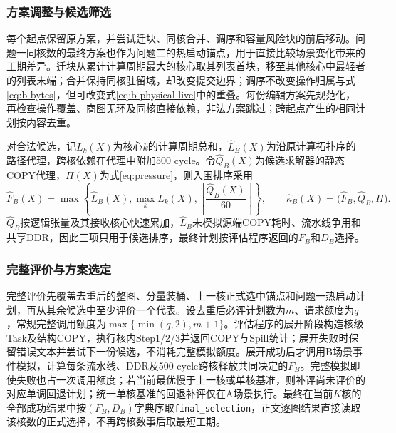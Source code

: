 \subsubsection{方案调整与候选筛选}
每个起点保留原方案，并尝试迁块、同核合并、调序和容量风险块的前后移动。问题一同核数的最终方案也作为问题二的热启动锚点，用于直接比较场景变化带来的工期差异。迁块从累计计算周期最大的核心取其列表首块，移至其他核心中最轻者的列表末端；合并保持同核驻留域，却改变提交边界；调序不改变操作归属与式\eqref{eq:b-bytes}，但可改变式\eqref{eq:b-physical-live}中的重叠。每份编辑方案先规范化，再检查操作覆盖、商图无环及同核直接依赖，非法方案跳过；跨起点产生的相同计划按内容去重。

对合法候选，记$L_k(X)$为核心$k$的计算周期总和，$\widehat L_B(X)$为沿原计算拓扑序的路径代理，跨核依赖在代理中附加500 cycle。令$\widehat Q_B(X)$为候选求解器的静态COPY代理，$\Pi(X)$为式\eqref{eq:pressure}，则入围排序采用
\begin{equation}
\widehat F_B(X)=\max\left\{\widehat L_B(X),\max_k L_k(X),
\left\lceil\frac{\widehat Q_B(X)}{60}\right\rceil\right\},\qquad
\widehat\kappa_B(X)=\bigl(\widehat F_B,\widehat Q_B,\Pi\bigr).
\label{eq:b-light-score}
\end{equation}
$\widehat Q_B$按逻辑张量及其接收核心快速累加，$\widehat L_B$未模拟源端COPY耗时、流水线争用和共享DDR，因此三项只用于候选排序，最终计划按评估程序返回的$F_B$和$D_B$选择。

\subsubsection{完整评价与方案选定}
完整评价先覆盖去重后的整图、分量装桶、上一核正式选中锚点和问题一热启动计划，再从其余候选中至少评价一个代表。设去重后必评计划数为$m$、请求额度为$q$，常规完整调用额度为$\max\{\min(q,2),m+1\}$。评估程序的展开阶段构造核级Task及结构COPY，执行核内Step1/2/3并返回COPY与Spill统计；展开失败时保留错误文本并尝试下一份候选，不消耗完整模拟额度。展开成功后才调用B场景事件模拟，计算每条流水线、DDR及500 cycle跨核释放共同决定的$F_B$。完整模拟即使失败也占一次调用额度；若当前最优慢于上一核或单核基准，则补评尚未评价的对应单调回退计划；统一单核基准的回退补评仅在A场景执行。最终在当前$K$核的全部成功结果中按$(F_B,D_B)$字典序取\texttt{final\_selection}，正文逐图结果直接读取该核数的正式选择，不再跨核数事后取最短工期。

